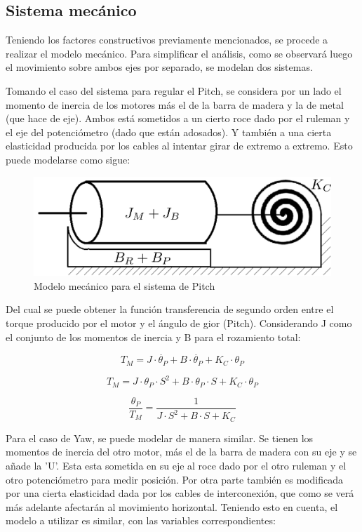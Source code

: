 \documentclass{article}
\begin{document}
\subsection{Sistema mecánico}
Teniendo los factores constructivos previamente mencionados, se procede a realizar el modelo mecánico. Para simplificar el análisis, como se observará luego el movimiento sobre ambos ejes por separado, se modelan dos sistemas.\par
Tomando el caso del sistema para regular el Pitch, se considera por un lado el momento de inercia de los motores más el de la barra de madera y la de metal (que hace de eje). Ambos está sometidos a un cierto roce dado por el ruleman y el eje del potenciómetro (dado que están adosados). Y también a una cierta elasticidad producida por los cables al intentar girar de extremo a extremo. Esto puede modelarse como sigue:

\begin{figure}[H]
\centering
\includegraphics[width=0.8\linewidth]{images/modelPitch.png}
\caption{Modelo mecánico para el sistema de Pitch}
\end{figure}

Del cual se puede obtener la función transferencia de segundo orden entre el torque producido por el motor y el ángulo de gior (Pitch). Considerando J como el conjunto de los momentos de inercia y B para el rozamiento total:

\[
T_M = J \cdot \ddot{\theta_P} + B \cdot \ddot{\theta_P} + K_C \cdot \theta_P
\]

\[
T_M = J \cdot \theta_P \cdot S^2 + B \cdot \theta_P \cdot S + K_C \cdot \theta_P
\]

\[
\frac{\theta_P}{T_M} = \frac{1}{J \cdot S^2 + B \cdot S + K_C}
\]

Para el caso de Yaw, se puede modelar de manera similar. Se tienen los momentos de inercia del otro motor, más el de la barra de madera con su eje y se añade la 'U'. Esta esta sometida en su eje al roce dado por el otro ruleman y el otro potenciómetro para medir posición. Por otra parte también es modificada por una cierta elasticidad dada por los cables de interconexión, que como se verá más adelante afectarán al movimiento horizontal. Teniendo esto en cuenta, el modelo a utilizar es similar, con las variables correspondientes:
\end{document}
